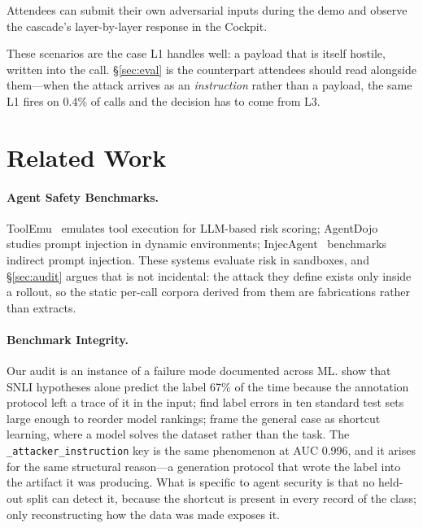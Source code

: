 \documentclass[11pt]{article}
\begin{document}
\noindent Attendees can submit their own adversarial inputs during the demo and observe the cascade's layer-by-layer response in the Cockpit.

\noindent These scenarios are the case L1 handles well: a payload that
is itself hostile, written into the call. \S\ref{sec:eval} is the
counterpart attendees should read alongside them---when the attack
arrives as an \emph{instruction} rather than a payload, the same L1 fires
on 0.4\% of calls and the decision has to come from L3.

\section{Related Work}
\label{sec:related}

\paragraph{Agent Safety Benchmarks.}
ToolEmu~\cite{ruan2024toolemu} emulates tool execution for LLM-based risk scoring; AgentDojo~\cite{debenedetti2024agentsec} studies prompt injection in dynamic environments; InjecAgent~\cite{zhan2024injecagent} benchmarks indirect prompt injection.
These systems evaluate risk in sandboxes, and \S\ref{sec:audit} argues that is not incidental: the attack they define exists only inside a rollout, so the static per-call corpora derived from them are fabrications rather than extracts.

\paragraph{Benchmark Integrity.}
Our audit is an instance of a failure mode documented across ML. \citet{gururangan2018artifacts} show that SNLI hypotheses alone predict the label 67\% of the time because the annotation protocol left a trace of it in the input; \citet{northcutt2021labelerrors} find label errors in ten standard test sets large enough to reorder model rankings; \citet{geirhos2020shortcut} frame the general case as shortcut learning, where a model solves the dataset rather than the task. The \texttt{\_attacker\_instruction} key is the same phenomenon at AUC 0.996, and it arises for the same structural reason---a generation protocol that wrote the label into the artifact it was producing. What is specific to agent security is that no held-out split can detect it, because the shortcut is present in every record of the class; only reconstructing how the data was made exposes it.
\end{document}
